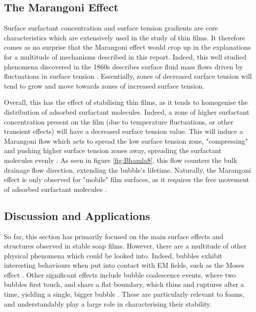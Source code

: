 \documentclass[a4paper,12pt]{article}
\numberwithin{equation}{section}
\numberwithin{figure}{section}
\numberwithin{table}{section}
\begin{document}
\subsection{The Marangoni Effect}
\label{sec:marangoni}
Surface surfactant concentration and surface tension gradients are core characteristics which are extensively used in the study of thin films. It therefore comes as no surprise that the Marangoni effect would crop up in the explanations for a multitude of mechanisms described in this report. Indeed, this well studied phenomena discovered in the 1860s describes surface fluid mass flows driven by fluctuations in surface tension \cite{Marangoni1965}. Essentially, zones of decreased surface tension will tend to grow and move towards zones of increased surface tension.

Overall, this has the effect of stabilising thin films, as it tends to homogenise the distribution of adsorbed surfactant molecules. Indeed, a zone of higher surfactant concentration present on the film (due to temperature fluctuations, or other transient effects) will have a decreased surface tension value. This will induce a Marangoni flow which acts to spread the low surface tension zone, "compressing" and pushing higher surface tension zones away, spreading the surfactant molecules evenly \cite{Bhamla2017}. As seen in figure \ref{fig:Bhamla8}, this flow counters the bulk drainage flow direction, extending the bubble's lifetime. Naturally, the Marangoni effect is only observed for "mobile" film surfaces, as it requires the free movement of adsorbed surfactant molecules \cite{Langevin1994, Nierstrasz1999}.

\subsection{Discussion and Applications}
So far, this section has primarily focused on the main surface effects and structures observed in stable soap films. However, there are a multitude of other physical phenomena which could be looked into. Indeed, bubbles exhibit interesting behaviours when put into contact with EM fields, such as the Moses effect \cite{Wilson1925, Legchenkova2018}. Other significant effects include bubble coalescence events, where two bubbles first touch, and share a flat boundary, which thins and ruptures after a time, yielding a single, bigger bubble \cite{Pfeiffer2020}. These are particularly relevant to foams, and understandably play a large role in characterising their stability.
\end{document}
